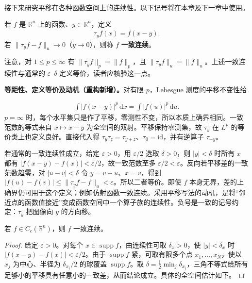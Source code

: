 \documentclass[../../main.tex]{subfiles}
\begin{document}
接下来研究平移在各种函数空间上的连续性。以下记号将在本章及下一章中使用。
\begin{definition}[平移与一致连续性]\label{definition:ch08-translation}
若 $f$ 是 $\mathbb R^n$ 上的函数、$y\in\mathbb R^n$，定义
\begin{align*}
\tau_yf(x)=f(x-y).
\end{align*}
若 $\|\tau_yf-f\|_u\to0$（$y\to0$），则称 $f$ \textbf{一致连续}。
\end{definition}
注意，对 $1\leqslant p\leqslant\infty$ 有 $\|\tau_yf\|_p=\|f\|_p$，且 $\|\tau_yf\|_u=\|f\|_u$。上述一致连续性与通常的 $\varepsilon$--$\delta$ 定义等价，读者应核验这一点。
\begin{remark}
\textbf{等距性、定义等价及动机（重构新增）。}对有限 $p$，Lebesgue 测度的平移不变性给

\begin{align*}
\int|f(x-y)|^p\,\mathrm dx=\int|f(u)|^p\,\mathrm du.
\end{align*}
$p=\infty$ 时，每个水平集只是作了平移，零测性不变，所以本质上确界相同。一致范数的等式来自 $x\mapsto x-y$ 为全空间的双射。平移保持零测集，故 $\tau_y$ 在 $L^p$ 的等价类上也定义良好。直接代入得 $\tau_y\tau_z=\tau_{y+z}$、$\tau_0=\mathrm{id}$，并有逆算子 $\tau_{-y}$。

若通常的一致连续性成立，给定 $\varepsilon>0$，用 $\varepsilon/2$ 选取 $\delta>0$，则 $|y|<\delta$ 时所有 $x$ 都有 $|f(x-y)-f(x)|<\varepsilon/2$，故一致范数至多 $\varepsilon/2<\varepsilon$。反向若平移差的一致范数趋零，对 $|u-v|<\delta$ 令 $y=v-u$、$x=v$，得到 $|f(u)-f(v)|\leqslant\|\tau_yf-f\|_u<\varepsilon$。所以二者等价。即使 $f$ 本身无界，差的上确界仍可用于这个定义；例如仿射函数一致连续。采用平移写法的动机，是将“邻近点的函数值接近”变成函数空间中一个算子族的连续性。负号是一致的记号约定：$\tau_y$ 把图像向 $y$ 的方向移。
\end{remark}
\begin{lemma}\label{lemma:ch08-compact-uniform-continuity}
若 $f\in C_c(\mathbb R^n)$，则 $f$ 一致连续。
\end{lemma}
\begin{proof}
给定 $\varepsilon>0$。对每个 $x\in\operatorname{supp} f$，由连续性可取 $\delta_x>0$，使 $|y|<\delta_x$ 时 $|f(x-y)-f(x)|<\varepsilon/2$。由于 $\operatorname{supp} f$ 紧，可取有限多个点 $x_1,\ldots,x_N$，使以 $x_j$ 为中心、半径为 $\delta_{x_j}/2$ 的球覆盖 $\operatorname{supp} f$。取 $\delta=\tfrac12\min_j\delta_{x_j}$，三角不等式给所有足够小的平移具有任意小的一致差，从而结论成立。具体的全空间估计如下。
\end{proof}
\end{document}
